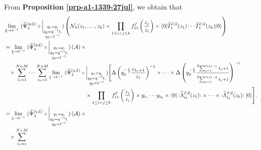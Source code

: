 \documentclass[12pt,reqno,a4paper]{amsart}
\newcommand{\comp}{\circ}
\newcommand{\cals}[1]{\mathcal{#1}}
\newcommand{\normord}[1]{:\mathrel{#1}:}
\numberwithin{equation}{section}
\newcommand{\dualmap}{
\widetilde{\Psi}^{(q,\xi)}_{\lambda}
}
\theoremstyle{definition}
\begin{document}
From \textbf{Proposition \ref{prp-a1-1339-27jul}}, we obtain that 
\footnotesize
\begin{align}
	&
	\lim_{\xi \rightarrow t^{-1}}\,\,
	(
	\dualmap
	\comp 
	\bigg|_{
		\substack{
			q_1 = q, \\
			q_2 = q^{-1}t,\\
			q_3 = t^{-1} \\
		}
	}
	)
	\left(
	\cals{N}_{\lambda}(z_1,\dots,z_k )
	\times
	\prod_{1 \leq i < j \leq k}f^{\vec{c}}_{11}\left(\frac{z_j}{z_i} \right)
	\times
	\langle 0 |\widetilde{T}^{\vec{c},\vec{u}}_{1}(z_1 )\cdots \widetilde{T}^{\vec{c},\vec{u}}_{1}(z_k )|0\rangle
	\right)
	\label{d7-eqn-1830-21jan}
	\\
	&= 
	\lim_{\xi \rightarrow t^{-1}}\,\,
	(
	\dualmap
	\comp 
	\bigg|_{
		\substack{
			q_1 = q, \\
			q_2 = q^{-1}t,\\
			q_3 = t^{-1} \\
		}
	}
	)
	\left(
	\cals{A}
	\right)
	\times
	\notag 
	\\
	&\hspace{0.3cm} \times \sum_{i_1 = 1}^{N+M}
	\cdots
	\sum_{i_k = 1}^{N+M}
	\lim_{\xi \rightarrow t^{-1}}\,\,
	(
	\dualmap
	\comp 
	\bigg|_{
		\substack{
			q_1 = q, \\
			q_2 = q^{-1}t,\\
			q_3 = t^{-1} \\
		}
	}
	)
	\Bigg[
	\Delta\left(	q_3^{-\frac{1}{2}}\frac{z_{\lambda_1 + 1}}{z_1}				\right)^{-1}
	\times 
	\cdots 
	\times 
	\Delta\left(	q_3^{-\frac{1}{2}}\frac{z_{\sum_{j = 1}^{\ell(\lambda) - 1}\lambda_j+1}}{z_{\sum_{j = 1}^{\ell(\lambda) - 2}\lambda_j+1}}				\right)^{-1}
	\notag 
	\\
	&\hspace{5.1cm}\times
	\prod_{1 \leq i < j \leq k}f^{\vec{c}}_{11}\left(\frac{z_j}{z_i} \right)
	\times
	y_{i_1} \cdots y_{i_k}
	\times 
	\langle 0 |			\normord{
		\widetilde{\Lambda}^{\vec{c},\vec{u}}_{i_1}(z_1)
	}
	\times
	\cdots
	\times
	\normord{
		\widetilde{\Lambda}^{\vec{c},\vec{u}}_{i_k}(z_k)
	}				
	|0\rangle
	\Bigg].
	\notag 
	\\
	&= 
	\lim_{\xi \rightarrow t^{-1}}\,\,
	(
	\dualmap
	\comp 
	\bigg|_{
		\substack{
			q_1 = q, \\
			q_2 = q^{-1}t,\\
			q_3 = t^{-1} \\
		}
	}
	)
	\left(
	\cals{A}
	\right)
	\times
	\notag 
	\\
	&\hspace{0.3cm} \times \sum_{i_1 = 1}^{N+M}

\end{align}
\end{document}

